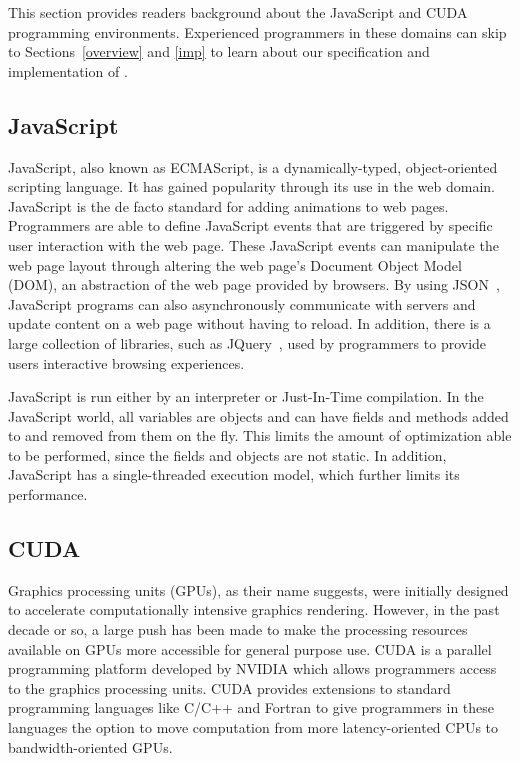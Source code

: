 
This section provides readers background about the JavaScript and CUDA
programming environments. Experienced programmers in these domains can skip to
Sections~\ref{overview} and \ref{imp} to learn about our specification and
implementation of \namens.

\subsection{JavaScript} JavaScript, also known as ECMAScript, is a
dynamically-typed, object-oriented scripting language.  It has gained popularity
through its use in the web domain. JavaScript is the de facto standard for
adding animations to web pages. Programmers are able to define JavaScript events
that are triggered by specific user interaction with the web page. These
JavaScript events can manipulate the web page layout through altering the web
page's Document Object Model (DOM), an abstraction of the web page provided by
browsers. By using JSON~\cite{json}, JavaScript programs can also asynchronously
communicate with servers and update content on a web page without having to
reload. In addition, there is a large collection of libraries, such as
JQuery~\cite{JQuery}, used by programmers to provide users interactive browsing
experiences.

JavaScript is run either by an interpreter or Just-In-Time compilation. In the
JavaScript world, all variables are objects and can have fields and methods
added to and removed from them on the fly. This limits the amount of
optimization able to be performed, since the fields and objects are not static. In
addition, JavaScript has a single-threaded execution model, which further limits
its performance.

\subsection{CUDA} Graphics processing units (GPUs), as their name suggests, were
initially designed to accelerate computationally intensive graphics rendering.
However, in the past decade or so, a large push has been made to make the
processing resources available on GPUs more accessible for general purpose use.
CUDA is a parallel programming platform developed by NVIDIA which allows
programmers access to the graphics processing units. CUDA provides extensions to
standard programming languages like C/C++ and Fortran to give programmers in
these languages the option to move computation from more latency-oriented CPUs
to bandwidth-oriented GPUs. 

